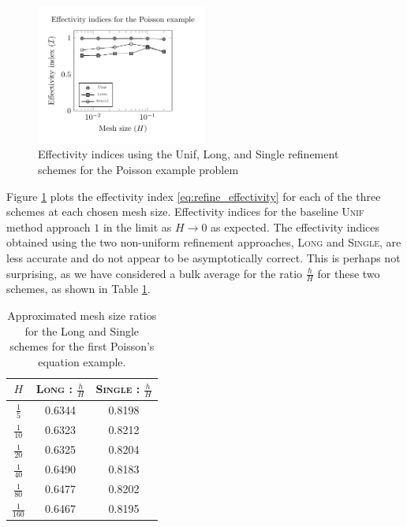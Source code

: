 \begin{figure}[ht!]
\centering
\includegraphics[width=0.5\textwidth]{img/refine_poisson_effectivity}
\caption{Effectivity indices using the Unif,
Long, and Single refinement schemes for
the Poisson example problem}
\label{fig:refine_poisson_effectivity}
\end{figure}

Figure \ref{fig:refine_poisson_effectivity} plots
the effectivity index \eqref{eq:refine_effectivity}
for each of the three schemes at each chosen
mesh size. Effectivity indices for the
baseline \textsc{Unif} method approach
$1$ in the limit as $H \to 0$ as expected. The effectivity
indices obtained using the two non-uniform refinement approaches,
\textsc{Long} and \textsc{Single}, are less accurate
and do not appear to be asymptotically correct.
This is perhaps not surprising, as we have considered a bulk
average for the ratio $\frac{h}{H}$ for these two schemes,
as shown in Table \ref{tab:refine_poisson_ratios}.

%
\begin{table}[ht!]
\centering
\begin{tabular}{ | c | c | c | } \hline
$H$ & \textsc{Long} : $\frac{h}{H}$ & \textsc{Single} : $\frac{h}{H}$ \\ \hline \hline
$\frac{1}{5}$ & 0.6344 & 0.8198 \\ \hline
$\frac{1}{10}$ & 0.6323 & 0.8212 \\ \hline
$\frac{1}{20}$ & 0.6325 & 0.8204 \\ \hline
$\frac{1}{40}$ & 0.6490 & 0.8183 \\ \hline
$\frac{1}{80}$ & 0.6477 & 0.8202 \\ \hline
$\frac{1}{160}$ & 0.6467 & 0.8195 \\ \hline
\end{tabular}
\caption{Approximated mesh size ratios for the Long and
Single schemes for the first Poisson's equation example.}
\label{tab:refine_poisson_ratios}
\end{table}

